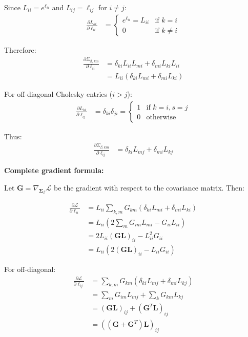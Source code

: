 \documentclass[11pt,a4paper]{article}
\begin{document}
Since $L_{ii} = e^{\ell_{ii}}$ and $L_{ij} = \ell_{ij}$ for $i \ne j$:
\begin{align}
\frac{\partial L_{ki}}{\partial \ell_{ii}} &= \begin{cases}
e^{\ell_{ii}} = L_{ii} & \text{if } k = i\\
0 & \text{if } k \ne i
\end{cases}
\end{align}

Therefore:
\begin{align}
\frac{\partial \Sigma_{\beta,km}}{\partial \ell_{ii}} &= \delta_{ki} L_{ii} L_{mi} + \delta_{mi} L_{ki} L_{ii}\\
&= L_{ii} (\delta_{ki} L_{mi} + \delta_{mi} L_{ki})
\end{align}

For off-diagonal Cholesky entries ($i > j$):
\begin{align}
\frac{\partial L_{ki}}{\partial \ell_{ij}} &= \delta_{ki} \delta_{ji} = \begin{cases}
1 & \text{if } k=i, s=j\\
0 & \text{otherwise}
\end{cases}
\end{align}

Thus:
\begin{align}
\frac{\partial \Sigma_{\beta,km}}{\partial \ell_{ij}} &= \delta_{ki} L_{mj} + \delta_{mi} L_{kj}
\end{align}

\textbf{Complete gradient formula:}

Let $\bm{G} = \nabla_{\bm{\Sigma}_\beta} \mathcal{L}$ be the gradient with respect to the covariance matrix. Then:

\begin{align}
\frac{\partial \mathcal{L}}{\partial \ell_{ii}} &= L_{ii} \sum_{k,m} G_{km} (\delta_{ki} L_{m i} + \delta_{mi} L_{ki})\\
&= L_{ii} \left(2 \sum_{m} G_{im} L_{mi} - G_{ii} L_{ii}\right)\\
&= 2 L_{ii} \left(\bm{G} \bm{L}\right)_{ii} - L_{ii}^2 G_{ii}\\
&= L_{ii} \left(2 (\bm{G} \bm{L})_{ii} - L_{ii} G_{ii}\right)
\end{align}

For off-diagonal:
\begin{align}
\frac{\partial \mathcal{L}}{\partial \ell_{ij}} &= \sum_{k,m} G_{km} (\delta_{ki} L_{mj} + \delta_{mi} L_{kj})\\
&= \sum_m G_{im} L_{mj} + \sum_k G_{km} L_{kj}\\
&= (\bm{G} \bm{L})_{ij} + (\bm{G}^T \bm{L})_{ij}\\
&= ((\bm{G} + \bm{G}^T) \bm{L})_{ij}
\end{align}
\end{document}
